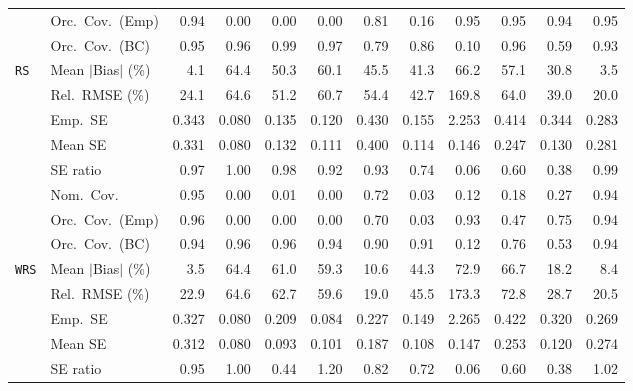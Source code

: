 \begin{landscape}
\begin{longtable}{llrrrrrrrrrr}
 & Orc.\ Cov.\ (Emp) & 0.94 & 0.00 & 0.00 & 0.00 & 0.81 & 0.16 & \cellcolor{ranktwo}0.95 & \cellcolor{rankthree}0.95 & 0.94 & \cellcolor{rankone}0.95 \\
 & Orc.\ Cov.\ (BC) & \cellcolor{rankone}0.95 & \cellcolor{rankthree}0.96 & 0.99 & 0.97 & 0.79 & 0.86 & 0.10 & \cellcolor{ranktwo}0.96 & 0.59 & 0.93 \\
\addlinespace[2pt]
\quad \texttt{RS} & Mean $|$Bias$|$ (\%) & \cellcolor{ranktwo}4.1 & 64.4 & 50.3 & 60.1 & 45.5 & 41.3 & 66.2 & 57.1 & \cellcolor{rankthree}30.8 & \cellcolor{rankone}3.5 \\
 & Rel.\ RMSE (\%) & \cellcolor{ranktwo}24.1 & 64.6 & 51.2 & 60.7 & 54.4 & 42.7 & 169.8 & 64.0 & \cellcolor{rankthree}39.0 & \cellcolor{rankone}20.0 \\
 & Emp.\ SE & 0.343 & 0.080 & 0.135 & 0.120 & 0.430 & 0.155 & 2.253 & 0.414 & 0.344 & 0.283 \\
 & Mean SE & 0.331 & 0.080 & 0.132 & 0.111 & 0.400 & 0.114 & 0.146 & 0.247 & 0.130 & 0.281 \\
 & SE ratio & 0.97 & \cellcolor{rankone}1.00 & \cellcolor{rankthree}0.98 & 0.92 & 0.93 & 0.74 & 0.06 & 0.60 & 0.38 & \cellcolor{ranktwo}0.99 \\
 & Nom.\ Cov. & \cellcolor{rankone}0.95 & 0.00 & 0.01 & 0.00 & \cellcolor{rankthree}0.72 & 0.03 & 0.12 & 0.18 & 0.27 & \cellcolor{ranktwo}0.94 \\
 & Orc.\ Cov.\ (Emp) & \cellcolor{rankone}0.96 & 0.00 & 0.00 & 0.00 & 0.70 & 0.03 & \cellcolor{rankthree}0.93 & 0.47 & 0.75 & \cellcolor{ranktwo}0.94 \\
 & Orc.\ Cov.\ (BC) & \cellcolor{rankone}0.94 & \cellcolor{rankthree}0.96 & \cellcolor{ranktwo}0.96 & 0.94 & 0.90 & 0.91 & 0.12 & 0.76 & 0.53 & 0.94 \\
\addlinespace[2pt]
\quad \texttt{WRS} & Mean $|$Bias$|$ (\%) & \cellcolor{rankone}3.5 & 64.4 & 61.0 & 59.3 & \cellcolor{rankthree}10.6 & 44.3 & 72.9 & 66.7 & 18.2 & \cellcolor{ranktwo}8.4 \\
 & Rel.\ RMSE (\%) & \cellcolor{rankthree}22.9 & 64.6 & 62.7 & 59.6 & \cellcolor{rankone}19.0 & 45.5 & 173.3 & 72.8 & 28.7 & \cellcolor{ranktwo}20.5 \\
 & Emp.\ SE & 0.327 & 0.080 & 0.209 & 0.084 & 0.227 & 0.149 & 2.265 & 0.422 & 0.320 & 0.269 \\
 & Mean SE & 0.312 & 0.080 & 0.093 & 0.101 & 0.187 & 0.108 & 0.147 & 0.253 & 0.120 & 0.274 \\
 & SE ratio & \cellcolor{rankthree}0.95 & \cellcolor{rankone}1.00 & 0.44 & 1.20 & 0.82 & 0.72 & 0.06 & 0.60 & 0.38 & \cellcolor{ranktwo}1.02 \\

\end{longtable}
\end{landscape}
